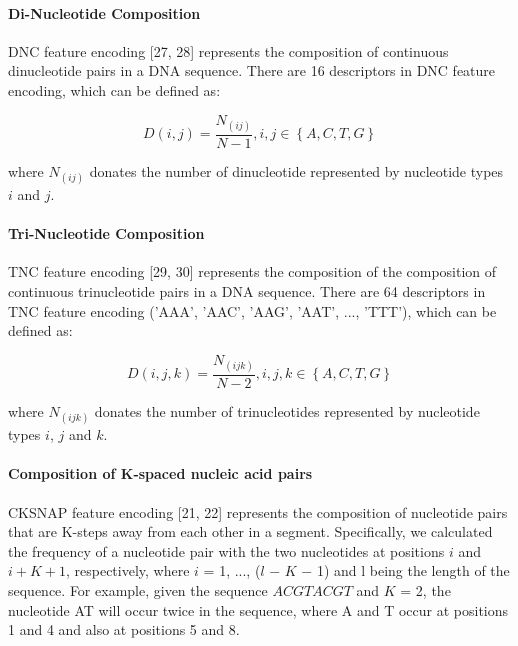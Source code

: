 \paragraph{Di-Nucleotide Composition}

\gls{DNC} feature encoding [27, 28] represents the composition of continuous dinucleotide pairs in a \gls{DNA} sequence. There are 16 descriptors in \gls{DNC} feature encoding, which can be defined as:

\begin{equation}\label{eq:DNC}
    D(i,j) = \frac{N_{(ij)}}{N-1}, i,j \in \left\{A,C,T,G\right\}
\end{equation}


where $N_{(ij)}$ donates the number of dinucleotide represented by nucleotide types $i$ and $j$.

\paragraph{Tri-Nucleotide Composition}

\gls{TNC} feature encoding [29, 30] represents the composition of the composition of continuous trinucleotide pairs in a \gls{DNA} sequence. There are 64 descriptors in \gls{TNC} feature encoding ('AAA', 'AAC', 'AAG', 'AAT', ..., 'TTT'), which can be defined as:

\begin{equation}\label{eq:TNC}
    D(i,j,k) = \frac{N_{(ijk)}}{N-2}, i,j,k \in \left\{A,C,T,G\right\}
\end{equation}

where $N_{(ijk)}$ donates the number of trinucleotides represented by nucleotide types $i$, $j$ and $k$.


\paragraph{Composition of K-spaced nucleic acid pairs}

\gls{CKSNAP} feature encoding [21, 22] represents the composition of nucleotide pairs that are K-steps away from each other in a segment. Specifically, we calculated the frequency of a nucleotide pair with the two nucleotides at positions $i$ and $i + K + 1$, respectively, where $i$ = 1, ..., ($l$ − $K$ − 1) and l being the length of the sequence. For example, given the sequence $ACGTACGT$ and $K$ = 2, the nucleotide AT will occur twice in the sequence, where A and T occur at positions 1 and 4 and also at positions 5 and 8. 

